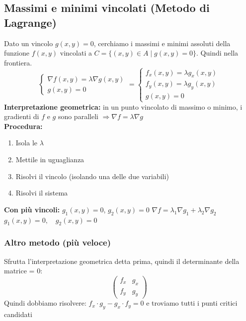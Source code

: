 \documentclass[10pt, a4paper]{article}
\begin{document}
    \subsection{Massimi e minimi vincolati (Metodo di Lagrange)}
        Dato un vincolo $g(x, y) = 0 $, cerchiamo i massimi e minimi assoluti della funzione $f(x, y)$ vincolati a $C = \{(x, y) \in A \mid g(x, y) = 0\}$. Quindi nella frontiera.
        \begin{equation*}
            \begin{cases}
                \nabla f(x, y) = \lambda \nabla g(x, y) \\
                g(x, y) = 0
            \end{cases} = \begin{cases}
                f_x(x,y) = \lambda g_x(x,y)\\
                f_y(x,y) = \lambda g_y(x,y)\\
                g(x,y) = 0
            \end{cases}
        \end{equation*}
        \textbf{Interpretazione geometrica:} in un punto vincolato di massimo o minimo, i gradienti di $f$ e $g$ sono paralleli $\Rightarrow \nabla f = \lambda \nabla g$
        \\\textbf{Procedura:}
        \begin{enumerate}
            \item Isola le $\lambda$
            \item Mettile in uguaglianza
            \item Risolvi il vincolo (isolando una delle due variabili)
            \item Risolvi il sistema
        \end{enumerate}
    \textbf{Con più vincoli: } $g_1(x, y) = 0$, $g_2(x, y) = 0$
    $\nabla f = \lambda_1 \nabla g_1 + \lambda_2 \nabla g_2$
    $g_1(x, y) = 0, \quad g_2(x, y) = 0$
    \subsubsection{Altro metodo (più veloce)}
        Sfrutta l'interpretazione geometrica detta prima, quindi il determinante della matrice = 0:
        $$
        \begin{pmatrix}
            f_x & g_x\\
            f_y & g_y
        \end{pmatrix}
        $$
        Quindi dobbiamo risolvere: $\displaystyle f_x\cdot g_y- g_x\cdot f_y=0$ e troviamo tutti i punti critici candidati
\end{document}
